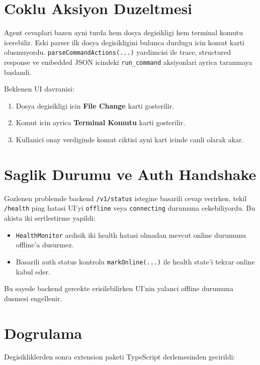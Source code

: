 \documentclass[12pt,a4paper]{article}
\begin{document}
\section{Coklu Aksiyon Duzeltmesi}

Agent cevaplari bazen ayni turda hem dosya degisikligi hem terminal komutu icerebilir. Eski parser ilk dosya degisikligini bulunca durdugu icin komut karti olusmuyordu. \texttt{parseCommandActions(...)} yardimcisi ile trace, structured response ve embedded JSON icindeki \texttt{run\_command} aksiyonlari ayrica taranmaya baslandi.

Beklenen UI davranisi:

\begin{enumerate}[leftmargin=2em]
  \item Dosya degisikligi icin \textbf{File Change} karti gosterilir.
  \item Komut icin ayrica \textbf{Terminal Komutu} karti gosterilir.
  \item Kullanici onay verdiginde komut ciktisi ayni kart icinde canli olarak akar.
\end{enumerate}

\section{Saglik Durumu ve Auth Handshake}

Gozlenen problemde backend \texttt{/v1/status} istegine basarili cevap verirken, tekil \texttt{/health} ping hatasi UI'yi \texttt{offline} veya \texttt{connecting} durumuna cekebiliyordu. Bu akista iki sertlestirme yapildi:

\begin{itemize}[leftmargin=2em]
  \item \texttt{HealthMonitor} ardisik iki health hatasi olmadan mevcut online durumunu offline'a dusurmez.
  \item Basarili auth status kontrolu \texttt{markOnline(...)} ile health state'i tekrar online kabul eder.
\end{itemize}

Bu sayede backend gercekte erisilebilirken UI'nin yalanci offline durumuna dusmesi engellenir.

\section{Dogrulama}

Degisikliklerden sonra extension paketi TypeScript derlemesinden gecirildi:
\end{document}
